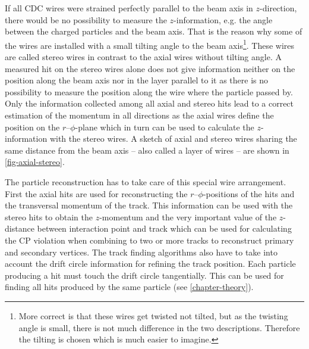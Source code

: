 If all CDC wires were strained perfectly parallel to the beam axis in $z$-direction, there would be no possibility to measure the $z$-information, e.g. the angle between the charged particles and the beam axis. That is the reason why some of the wires are installed with a small tilting angle to the beam axis\footnote{More correct is that these wires get twisted not tilted, but as the twisting angle is small, there is not much difference in the two descriptions. Therefore the tilting is chosen which is much easier to imagine.}. These wires are called stereo wires in contrast to the axial wires without tilting angle. A measured hit on the stereo wires alone does not give information neither on the position along the beam axis nor in the layer parallel to it as there is no possibility to measure the position along the wire where the particle passed by. Only the information collected among all axial and stereo hits lead to a correct estimation of the momentum in all directions as the axial wires define the position on the $r$--$\phi$-plane which in turn can be used to calculate the $z$-information with the stereo wires. A sketch of axial and stereo wires sharing the same distance from the beam axis -- also called a layer of wires -- are shown in \ref{fig-axial-stereo}. 

The particle reconstruction has to take care of this special wire arrangement. First the axial hits are used for reconstructing the $r$--$\phi$-positions of the hits and the transversal momentum of the track. This information can be used with the stereo hits to obtain the $z$-momentum and the very important value of the $z$-distance between interaction point and track which can be used for calculating the CP violation when combining to two or more tracks to reconstruct primary and secondary vertices. The track finding algorithms also have to take into account the drift circle information for refining the track position. Each particle producing a hit must touch the drift circle tangentially. This can be used for finding all hits produced by the same particle (see \ref{chapter-theory}).

